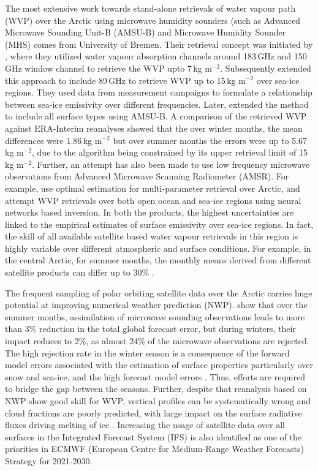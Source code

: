 \documentclass[12pt,oneside,a4paper]{article}
\begin{document}
The most extensive work towards stand-alone retrievals of water vapour path
(WVP) over the Arctic using microwave humidity sounders (such as Advanced Microwave Sounding Unit-B (AMSU-B) and Microwave Humidity Sounder (MHS) comes from University of Bremen. Their retrieval concept was initiated by \citet{miao:2001:atmos}, where they utilized water vapour absorption channels around 183\,GHz and 150\,GHz window channel to retrieve the WVP upto 7\,kg m$^{-2}$. Subsequently \citet{melsheimer:2008:impro} extended this approach to include 89\,GHz to retrieve WVP up to 15\,kg m$^{-2}$ over sea-ice regions. They used data from
measurement campaigns to formulate a relationship between sea-ice emissivity
over different frequencies. Later, \citet{scarlat:2018:retri} extended the
method to include all surface types using AMSU-B. A comparison of the retrieved
WVP against ERA-Interim reanalyses showed that the over winter months, the mean differences were 1.86\,kg m$^{-2}$ but over summer months the errors were up to 5.67\,kg
m$^{-2}$, due to the algorithm being constrained by its upper retrieval limit of
15\,kg m$^{-2}$. Further, an attempt has also been made to use low
frequency microwave observations from Advanced Microwave Scanning Radiometer
(AMSR). For example, \citet{scarlat:2017:exper} use optimal estimation for multi-parameter retrieval over Arctic, and \citet{zabolotskikh:2020:anadv}
attempt WVP retrievals over both open ocean and sea-ice regions using neural
networks based inversion. In both the products, the highest uncertainties are linked to the empirical estimates of surface emissivity over
sea-ice regions. In fact, the skill of all available satellite based water
vapour retrievals in this region is highly variable over different atmospheric
and surface conditions. For example, in the central Arctic, for summer months,
the monthly means derived from different satellite products can differ up to
30\% \citep{crewell:2021:asyst}.

The frequent sampling of polar orbiting satellite data over the Arctic carries
huge potential at improving numerical weather prediction (NWP).
\citet{lawrence:2019:usean} show that over the summer months, assimilation of
microwave sounding observations leads to more than 3\% reduction in the total
global forecast error, but during winters, their impact reduces to 2\%, as
almost 24\% of the microwave observations are rejected. The high rejection rate
in the winter season is a consequence of the forward model errors associated
with the estimation of surface properties particularly over snow and sea-ice,
and the high forecast model errors \citep{bauer:2016:aspec}. Thus, efforts are
required to bridge the gap between the seasons. Further, despite that
reanalysis based on NWP show good skill for WVP, vertical profiles can be
systematically wrong and cloud fractions are poorly predicted, with large
impact on the surface radiative fluxes driving melting of ice
\citep{graham:2019:evalu}. Increasing the usage of satellite data over all
surfaces in the Integrated Forecast System (IFS) is also identified as one of the
priorities in ECMWF (European Centre for Medium-Range Weather Forecasts)
Strategy for 2021-2030.
\end{document}
